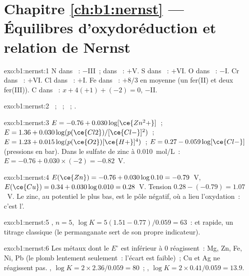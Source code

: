\section*{Chapitre \ref{ch:b1:nernst} --- Équilibres d'oxydoréduction et relation de Nernst}

\begin{solution}{exo:b1:nernst:1}
N dans ~: $-$III~; dans ~: $+$V. S dans ~:
$+$VI. O dans
~: $-$I. Cr dans ~: $+$VI. Cl dans ~:
$+$I. Fe dans
~: $+8/3$ en moyenne (un fer(II) et deux fer(III)). C dans
~: $x + 4(+1) + (-2) = 0$, $-$II.
\end{solution}

\begin{solution}{exo:b1:nernst:2}
~;
~;
~;
.
\end{solution}

\begin{solution}{exo:b1:nernst:3}
$E = -0.76 + 0.030\log[\ce{Zn^2+}]$~; $E = 1.36 + 0.030\log(p(\ce{Cl2})/[\ce{Cl-}]^2)$~;
$E = 1.23 + 0.015\log(p(\ce{O2})[\ce{H+}]^4)$~; $E = 0.27 - 0.059\log[\ce{Cl-}]$
(pressions en bar). Dans le sulfate de zinc à \qty{0.010}{mol/L}~:
$E = -0.76 + 0.030 \times (-2) = -0.82$~V.
\end{solution}

\begin{solution}{exo:b1:nernst:4}
$E(\ce{Zn}) = -0.76 + 0.030\log 0.10 = -0.79$~V, $E(\ce{Cu}) = 0.34 +
0.030\log 0.010 = 0.28$~V. Tension $0.28 - (-0.79) = 1.07$~V. Le zinc,
au potentiel le plus bas, est le pôle négatif, où a lieu l'oxydation~:
c'est l'.
\end{solution}

\begin{solution}{exo:b1:nernst:5}
, $n = 5$,
$\log K = 5(1.51 - 0.77)/0.059 = 63$~:  et rapide,
un titrage classique (le permanganate sert de son propre indicateur).
\end{solution}

\begin{solution}{exo:b1:nernst:6}
Les métaux dont le $E^\circ$ est inférieur à 0 réagissent~: Mg, Zn, Fe,
Ni, Pb (le plomb lentement seulement~: l'écart est faible)~; Cu et Ag ne
réagissent pas. , $\log K = 2 \times 2.36/0.059 = 80$~;
, $\log K = 2 \times 0.41/0.059 = 13.9$.
\end{solution}

